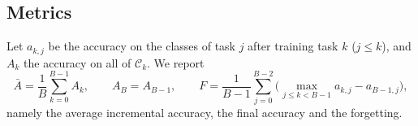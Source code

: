 \subsection{Metrics}
Let $a_{k,j}$ be the accuracy on the classes of task $j$ after training task
$k$ ($j\le k$), and $A_k$ the accuracy on all of $\mathcal C_k$. We report
\begin{equation}
  \bar A=\frac1B\sum_{k=0}^{B-1}A_k,\qquad A_B=A_{B-1},\qquad
  F=\frac1{B-1}\sum_{j=0}^{B-2}\Big(\max_{j\le k<B-1}a_{k,j}-a_{B-1,j}\Big),
  \label{eq:metrics}
\end{equation}
namely the average incremental accuracy, the final accuracy and the
forgetting.
